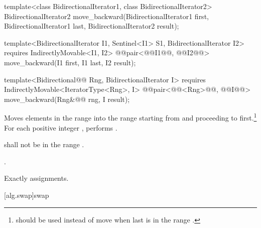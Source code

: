%
\begin{removedblock}
\begin{itemdecl}
template<class BidirectionalIterator1, class BidirectionalIterator2>
  BidirectionalIterator2
    move_backward(BidirectionalIterator1 first,
                  BidirectionalIterator1 last,
                  BidirectionalIterator2 result);
\end{itemdecl}
\end{removedblock}
\begin{addedblock}
\begin{itemdecl}
template<BidirectionalIterator I1, Sentinel<I1> S1, BidirectionalIterator I2>
  requires IndirectlyMovable<I1, I2>
  @@pair<@@I1@\newtxt{)}@, @@I2@\newtxt{)}@>
    move_backward(I1 first, I1 last, I2 result);

template<Bidirectional@@ Rng, BidirectionalIterator I>
  requires IndirectlyMovable<IteratorType<Rng>, I>
  @@pair<@@<Rng>@\newtxt{)}@, @@I@\newtxt{)}@>
    move_backward(Rng&@\newtxt{\&}@ rng, I result);
\end{itemdecl}
\end{addedblock}

\begin{itemdescr}
\pnum
\effects
Moves elements in the range 
into the
range 
starting from
and proceeding to first.\footnote{
should be used instead of move when last
is in
the range
.}
For each positive integer
,
performs
.

\pnum
\requires
{}
shall not be in the range
.

\pnum
\returns
{}.

\pnum
\complexity
Exactly
assignments.
\end{itemdescr}

[alg.swap]{swap}

